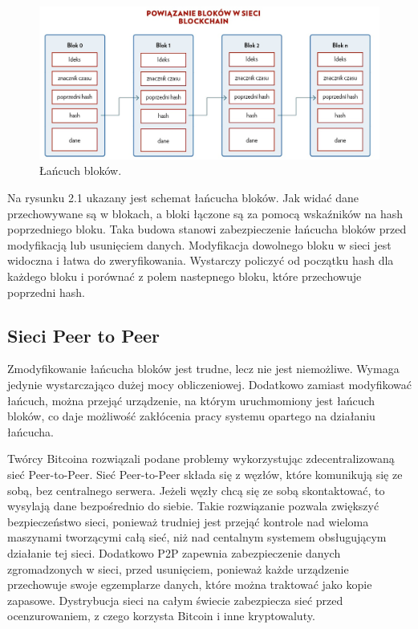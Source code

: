\documentclass[a4paper,13pt]{report}
\begin{document}
\begin{figure}[h]
    	\centering
	\includegraphics[width=\textwidth]{images/łańcuch_bloków.jpg}
	\caption {Łańcuch bloków.}
\end {figure}

Na rysunku 2.1 ukazany jest schemat łańcucha bloków. Jak widać dane przechowywane są w blokach, a bloki łączone są za pomocą wskaźników na hash poprzedniego bloku. Taka budowa stanowi zabezpieczenie łańcucha bloków przed modyfikacją lub usunięciem danych. Modyfikacja dowolnego bloku w sieci jest widoczna i łatwa do zweryfikowania. Wystarczy policzyć od początku hash dla każdego bloku i porównać z polem nastepnego bloku, które przechowuje poprzedni hash.

\subsection{Sieci Peer to Peer}

Zmodyfikowanie łańcucha bloków jest trudne, lecz nie jest niemożliwe. Wymaga jedynie wystarczająco dużej mocy obliczeniowej. Dodatkowo zamiast modyfikować łańcuch, można przejąć urządzenie, na którym uruchmomiony jest łańcuch bloków, co daje możliwość zakłócenia pracy systemu opartego na działaniu łańcucha.

Twórcy Bitcoina rozwiązali podane problemy wykorzystując zdecentralizowaną sieć Peer-to-Peer. Sieć Peer-to-Peer składa się z węzłów, które komunikują się ze sobą, bez centralnego serwera. Jeżeli węzły chcą się ze sobą skontaktować, to wysylają dane bezpośrednio do siebie. Takie rozwiązanie pozwala zwiększyć bezpieczeństwo sieci, ponieważ trudniej jest przejąć kontrole nad wieloma maszynami tworzącymi całą sieć, niż nad centalnym systemem obsługującym działanie tej sieci. Dodatkowo P2P zapewnia zabezpieczenie danych zgromadzonych w sieci, przed usunięciem, ponieważ każde urządzenie przechowuje swoje egzemplarze danych, które można traktować jako kopie zapasowe. Dystrybucja sieci na całym świecie zabezpiecza sieć przed ocenzurowaniem, z czego korzysta Bitcoin i inne kryptowaluty.
\end{document}
